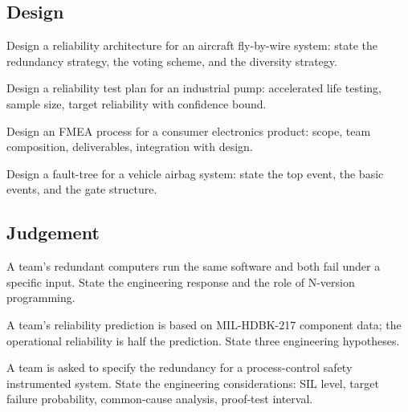 \subsection*{Design}

\begin{exercise}
Design a reliability architecture for an aircraft fly-by-wire system: state the redundancy strategy, the voting scheme, and the diversity strategy.
\end{exercise}

\begin{exercise}
Design a reliability test plan for an industrial pump: accelerated life testing, sample size, target reliability with confidence bound.
\end{exercise}

\begin{exercise}
Design an FMEA process for a consumer electronics product: scope, team composition, deliverables, integration with design.
\end{exercise}

\begin{exercise}
Design a fault-tree for a vehicle airbag system: state the top event, the basic events, and the gate structure.
\end{exercise}

\subsection*{Judgement}

\begin{exercise}
A team's redundant computers run the same software and both fail under a specific input. State the engineering response and the role of N-version programming.
\end{exercise}

\begin{exercise}
A team's reliability prediction is based on MIL-HDBK-217 component data; the operational reliability is half the prediction. State three engineering hypotheses.
\end{exercise}

\begin{exercise}
A team is asked to specify the redundancy for a process-control safety instrumented system. State the engineering considerations: SIL level, target failure probability, common-cause analysis, proof-test interval.
\end{exercise}

